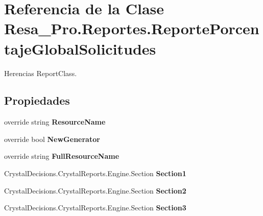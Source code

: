 \section{Referencia de la Clase Resa\+\_\+\+Pro.\+Reportes.\+Reporte\+Porcentaje\+Global\+Solicitudes}
\label{class_resa___pro_1_1_reportes_1_1_reporte_porcentaje_global_solicitudes}


Herencias Report\+Class.

\subsection*{Propiedades}
\begin{DoxyCompactItemize}
\item 
override string {\bfseries Resource\+Name}\hspace{0.3cm}{\ttfamily  [get, set]}\label{class_resa___pro_1_1_reportes_1_1_reporte_porcentaje_global_solicitudes_a4f9def01a3a9f13f1f337e603692a10c}

\item 
override bool {\bfseries New\+Generator}\hspace{0.3cm}{\ttfamily  [get, set]}\label{class_resa___pro_1_1_reportes_1_1_reporte_porcentaje_global_solicitudes_a92592435eef39a3e357fa0695f320ec6}

\item 
override string {\bfseries Full\+Resource\+Name}\hspace{0.3cm}{\ttfamily  [get, set]}\label{class_resa___pro_1_1_reportes_1_1_reporte_porcentaje_global_solicitudes_a13fa159473ceed5eca8a3726f1826e31}

\item 
Crystal\+Decisions.\+Crystal\+Reports.\+Engine.\+Section {\bfseries Section1}\hspace{0.3cm}{\ttfamily  [get]}\label{class_resa___pro_1_1_reportes_1_1_reporte_porcentaje_global_solicitudes_aa09a2ee86ca70bc9a058212c0abcc099}

\item 
Crystal\+Decisions.\+Crystal\+Reports.\+Engine.\+Section {\bfseries Section2}\hspace{0.3cm}{\ttfamily  [get]}\label{class_resa___pro_1_1_reportes_1_1_reporte_porcentaje_global_solicitudes_afc73825c30feaf60081ae94320ab0e88}

\item 
Crystal\+Decisions.\+Crystal\+Reports.\+Engine.\+Section {\bfseries Section3}\hspace{0.3cm}{\ttfamily  [get]}\label{class_resa___pro_1_1_reportes_1_1_reporte_porcentaje_global_solicitudes_ad442aa3c210641e134d95551879a135d}


\end{DoxyCompactItemize}
